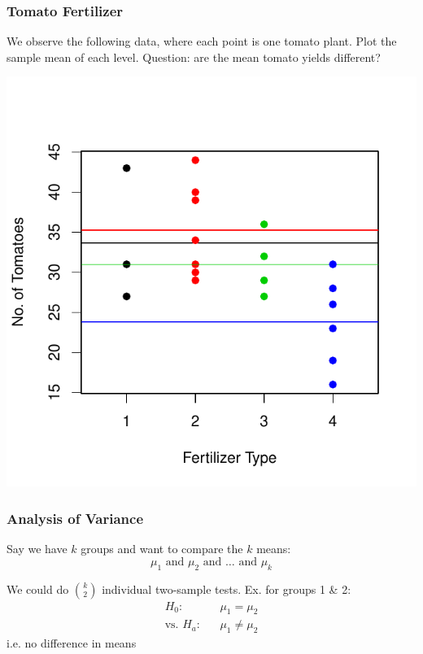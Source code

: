 \documentclass[handout]{beamer}
\newcommand{\blue}[1]{\textcolor{blue2}{#1}}
\begin{document}
\addtocounter{framenumber}{-1}
\begin{frame}
\frametitle{Tomato Fertilizer}
We observe the following data, where each point is one tomato plant.  Plot the sample mean of each level. \blue{Question:  are the mean tomato yields different?}
\begin{center}
\includegraphics{figure/lec22-004}
\end{center}
\end{frame}


\begin{frame}
\frametitle{Analysis of Variance}
Say we have $k$ groups and want to compare the $k$ means:
\[
\mu_1 \mbox{ and } \mu_2 \mbox{ and } \ldots \mbox{ and } \mu_k
\]

\pause \vspace{0.5cm}

We could do ${k \choose 2}$ individual two-sample tests.  Ex. for groups 1 \& 2:
\begin{eqnarray*}
H_0: && \mu_1 = \mu_2\\
\mbox{vs. } H_a:  && \mu_1 \neq \mu_2
\end{eqnarray*}
\pause i.e. no difference in means

\end{frame}
\end{document}
